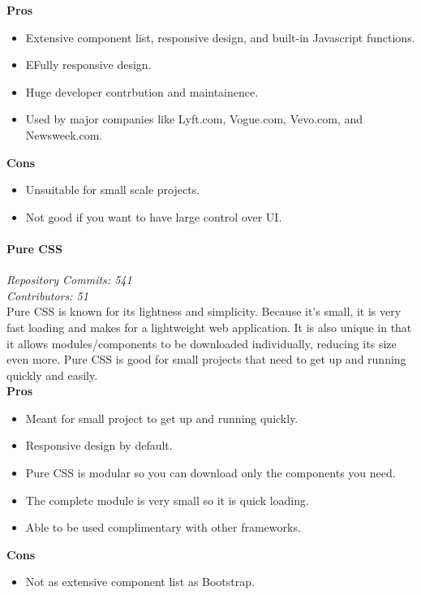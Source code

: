 \textbf{Pros}
\begin{itemize}
    \item Extensive component list, responsive design, and built-in Javascript functions.\cite{puranjay_2015}
    \item EFully responsive design.
    \item Huge developer contrbution and maintainence.
    \item Used by major companies like Lyft.com, Vogue.com, Vevo.com, and Newsweek.com. \cite{puranjay_2015}
\end{itemize}
\textbf{Cons}
\begin{itemize}
    \item Unsuitable for small scale projects. \cite{puranjay_2015}
    \item Not good if you want to have large control over UI.
\end{itemize}
\paragraph{Pure CSS}
\textit{Repository Commits: 541}\\ 
\textit{Contributors: 51}\\
Pure CSS is known for its lightness and simplicity. Because it's small, it is very fast loading and makes for a lightweight web application. It is also unique in that it allows modules/components to be downloaded individually, reducing its size even more. Pure CSS is good for small projects that need to get up and running quickly and easily.\\
\textbf{Pros}
\begin{itemize}
    \item Meant for small project to get up and running quickly.
    \item Responsive design by default.
    \item Pure CSS is modular so you can download only the components you need.
    \item The complete module is very small so it is quick loading.
    \item Able to be used complimentary with other frameworks.
\end{itemize}
\textbf{Cons} 
\begin{itemize}
    \item Not as extensive component list as Bootstrap.
\end{itemize}
